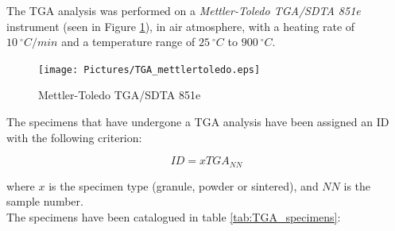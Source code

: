 \documentclass[a4paper]{article}
\begin{document}
            The TGA analysis was performed on a \textit{Mettler-Toledo TGA/SDTA 851e} instrument (seen in Figure \ref{fig:TGA_mettlertoledo}), 
            in air atmosphere, with a heating rate of $10 \ ^{\circ}C/min$ and a temperature range of $25 \ ^{\circ}C$ to $900 \ ^{\circ}C$. \\

            \begin{figure}[H]
                \centering
                \texttt{[image: Pictures/TGA\_mettlertoledo.eps]}
                \caption{Mettler-Toledo TGA/SDTA 851e}
                \label{fig:TGA_mettlertoledo}
            \end{figure}

            The specimens that have undergone a TGA analysis have been assigned an ID with the following criterion:

                \begin{equation}
                    ID = xTGA_{NN}
                    \label{eq:TGA_ID}
                \end{equation}

            where $x$ is the specimen type (granule, powder or sintered), and $NN$ is the sample number. \\

            The specimens have been catalogued in table \ref{tab:TGA_specimens}:

                    \begin{table}[ht]
                        \centering
                        \caption{TGA specimens}
        
                        \label{tab:TGA_specimens}
                    \end{table}
\end{document}
